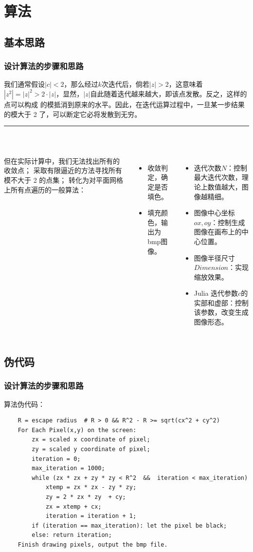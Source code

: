 \documentclass[8pt,c,compress,UTF8]{ctexbeamer}
\begin{document}
\section{算法}

\subsection{基本思路}
\begin{frame} 
\frametitle{设计算法的步骤和思路} 
我们通常假设$|c|<2$，那么经过$k$次迭代后，倘若$|z|>2$，这意味着
$|z^2|=|z|^2>2\cdot|z|$，显然，$|z|$自此随着迭代越来越大，即该点发散。反之，这样的点可以构成
的模抵消到原来的水平。因此，在迭代运算过程中，一旦某一步结果的模大于 2 了，可以断定它必将发散到无穷。
{\noindent}  \rule[-10pt]{12.2cm}{0.05em}\\
\begin{columns}
但在实际计算中，我们无法找出所有的收敛点；
采取有限逼近的方法寻找所有模不大于 2 的点集；
转化为对平面网格上所有点遍历的一般算法：
\begin{itemize}
    \item 收敛判定，确定是否填色。
    \item 填充颜色，输出为bmp图像。
\end{itemize}
\begin{itemize}
    \item 迭代次数$N$：控制最大迭代次数，理论上数值越大，图像越精细。
    \item 图像中心坐标$ox,oy$：控制生成图像在画布上的中心位置。
    \item 图像半径尺寸$Dimension$：实现缩放效果。
    \item Julia 迭代参数$c$的实部和虚部：控制该参数，改变生成图像形态。
\end{itemize}
\end{columns}
\end{frame}

\subsection{伪代码}
\begin{frame}[fragile]
\frametitle{设计算法的步骤和思路}
\begin{block}{算法伪代码：}
\begin{lstlisting}
    R = escape radius  # R > 0 && R^2 - R >= sqrt(cx^2 + cy^2)
    For Each Pixel(x,y) on the screen:
        zx = scaled x coordinate of pixel;
        zy = scaled y coordinate of pixel;
        iteration = 0;
        max_iteration = 1000;
        while (zx * zx + zy * zy < R^2  &&  iteration < max_iteration)
            xtemp = zx * zx - zy * zy;
            zy = 2 * zx * zy  + cy;
            zx = xtemp + cx;
            iteration = iteration + 1;
        if (iteration == max_iteration): let the pixel be black;
        else: return iteration;
    Finish drawing pixels, output the bmp file.
\end{lstlisting}
\end{block}
\end{frame}
\end{document}
